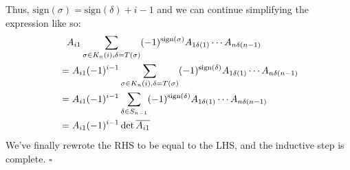 \documentclass[12pt]{article}
\begin{document}
\begin{enumerate}
\begin{enumerate}
                        Thus, $\text{sign}(\sigma)=\text{sign}(\delta)+i-1$ and we can continue simplifying the expression like so:
                        \begin{align*}
                               & \hphantom{=} A_{i1}\sum_{\sigma \in K_n(i), \delta=T(\sigma)} (-1)^{\text{sign}(\sigma)} A_{1\delta(1)} \cdots A_{n\delta(n-1)}  \\
                               & = A_{i1} (-1)^{i-1} \sum_{\sigma \in K_n(i), \delta=T(\sigma)} (-1)^{\text{sign}(\delta)} A_{1\delta(1)} \cdots A_{n\delta(n-1)} \\
                               & = A_{i1} (-1)^{i-1} \sum_{\delta \in S_{n-1}} (-1)^{\text{sign}(\delta)} A_{1\delta(1)} \cdots A_{n\delta(n-1)}                  \\
                               & = A_{i1}(-1)^{i-1} \det \overline{A_{i1}}
                        \end{align*}
                        We've finally rewrote the RHS to be equal to the LHS, and the inductive step is complete. $\square$
            \end{enumerate}
\end{enumerate}
\end{document}
